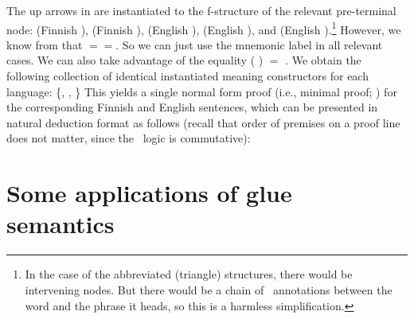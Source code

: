 \documentclass[output=paper,hidelinks]{langscibook}
\begin{document}
The up arrows in  are instantiated to the
f-structure of the relevant pre-terminal node:  (Finnish
),  (Finnish ),  (English
),  (English ), and  (English
).\footnote{In the case of the abbreviated (triangle)
  structures, there would be intervening nodes. But there would be a
  chain of \updown\ annotations between the word and the phrase it
  heads, so this is a harmless simplification.} However, we know
from  that \;$=$\;\;$=$\;. So we can just use the mnemonic label  in all relevant
cases. We
can also take advantage of the equality ( ) $=$
. We obtain the 
following collection of identical instantiated meaning constructors
for each language:%
\ea
\{,
  , \}
\z
%
This yields a single normal form proof (i.e., minimal proof;
\citealt{prawitz65}) for the corresponding Finnish and English
sentences, which can be presented in natural deduction format as
follows (recall that order of premises on a proof line does not
matter, since the \glue\ logic is commutative):
%


\section{Some applications of glue semantics}
\end{document}
